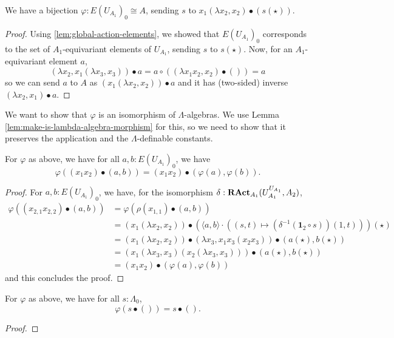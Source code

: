 \begin{lemma}
  We have a bijection $ \varphi: E(U_{A_1})_0 \cong A $, sending $ s $ to $ x_1 (\lambda x_2, x_2) \bullet (s(\star)) $.
\end{lemma}
\begin{proof}
  Using \ref{lem:global-action-elements}, we showed that $ E(U_{A_1})_0 $ corresponds to the set of $ A_1 $-equivariant elements of $ U_{A_1} $, sending $ s $ to $ s(\star) $. Now, for an $ A_1 $-equivariant element $ a $,
  \[ (\lambda x_2, x_1 (\lambda x_3, x_3)) \bullet a = a \circ ((\lambda x_1 x_2, x_2) \bullet ()) = a \]
  so we can send $ a $ to $ A $ as $ (x_1 (\lambda x_2, x_2)) \bullet a $ and it has (two-sided) inverse $ (\lambda x_2, x_1) \bullet a $.
\end{proof}

We want to show that $ \varphi $ is an isomorphism of $ \Lambda $-algebras. We use Lemma \ref{lem:make-is-lambda-algebra-morphism} for this, so we need to show that it preserves the application and the $ \Lambda $-definable constants.

\begin{lemma}
  For $ \varphi $ as above, we have for all $ a, b: E(U_{A_1})_0 $, we have
  \[ \varphi((x_1 x_2) \bullet (a, b)) = (x_1 x_2) \bullet (\varphi(a), \varphi(b)). \]
\end{lemma}
\begin{proof}
  For $ a, b: E(U_{A_1})_0 $, we have, for the isomorphism $ \delta: \mathbf{RAct}_{A_1}(U_{A_1}^{U_{A_1}}, A_2) $,
  \begin{align*}
    \varphi((x_{2, 1} x_{2, 2}) \bullet (a, b)) &= \varphi(\rho(x_{1, 1}) \bullet (a, b))\\
    &= (x_1 (\lambda x_2, x_2)) \bullet (\langle a, b \rangle \cdot ((s, t) \mapsto (\delta^{-1}(\mathbf 1_2 \circ s)) (1, t)))(\star)\\
    &= (x_1 (\lambda x_2, x_2)) \bullet (\lambda x_3, x_1 x_3 (x_2 x_3)) \bullet (a(\star), b(\star))\\
    &= (x_1 (\lambda x_3, x_3) (x_2 (\lambda x_3, x_3))) \bullet (a(\star), b(\star))\\
    &= (x_1 x_2) \bullet (\varphi(a), \varphi(b))
  \end{align*}
  and this concludes the proof.
\end{proof}

\begin{lemma}
  For $ \varphi $ as above, we have for all $ s: \Lambda_0 $,
  \[ \varphi(s \bullet ()) = s \bullet (). \]
\end{lemma}
\begin{proof}
  \TODO
\end{proof}

